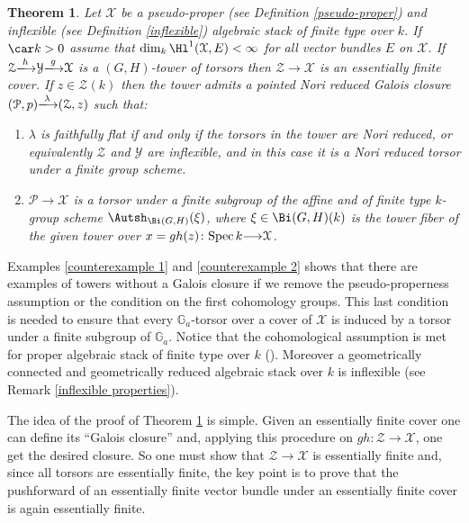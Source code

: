 \documentclass[12pt,reqno]{amsart}
\theoremstyle{plain}
\theoremstyle{definition}
\numberwithin{thm}{section}
\newcounter{x}\setcounter{x}{1}
\theoremstyle{plain}
\newtheorem{thmII}{Theorem}
\begin{document}
\begin{thmII}\label{main theorem for Galois closure}
 Let ${\mathcal{X}}$ be a pseudo-proper (see Definition \ref{pseudo-proper}) and inflexible
(see Definition \ref{inflexible}) algebraic stack of finite type over $k$. If $\car k > 0$ assume that $\dim_k \Hl^1({\mathcal{X}},E)<\infty$ for all vector bundles $E$ on ${\mathcal{X}}$. If ${\mathcal{Z}}{\xlongrightarrow{h}} {\mathcal{Y}}{\xlongrightarrow{g}} {\mathcal{X}}$ is a $(G,H)$-tower of torsors then ${\mathcal{Z}}{\longrightarrow} {\mathcal{X}}$ is an essentially finite cover. If $z\in {\mathcal{Z}}(k)$ then the tower admits a pointed Nori reduced Galois closure $({\mathcal{P}},p) {\xlongrightarrow{\lambda}} ({\mathcal{Z}},z)$ such that:
 \begin{enumerate}
 \item $\lambda$ is faithfully flat if and only if the torsors in the tower are Nori reduced, or equivalently ${\mathcal{Z}}$ and ${\mathcal{Y}}$ are inflexible, and in this case it is a Nori reduced torsor under a finite group scheme.
  \item ${\mathcal{P}}{\longrightarrow} {\mathcal{X}}$ is a torsor under a finite subgroup of the affine and of finite type $k$-group scheme $\Autsh_{\Bi(G,H)}(\xi)$, where $\xi\in \Bi(G,H)(k)$ is the tower fiber of the given tower over $x=gh(z)\colon {{\rm Spec \,}} k{\longrightarrow} {\mathcal{X}}$.
 \end{enumerate}
\end{thmII}
Examples \ref{counterexample 1} and \ref{counterexample 2} shows that there are examples of towers without a Galois closure if we remove the pseudo-properness assumption or the condition on the first cohomology groups. This last condition is needed to ensure that every $\mathbb G_a$-torsor over a cover of ${\mathcal{X}}$ is induced by a torsor under a finite subgroup of $\mathbb G_a$.
Notice that the cohomological assumption is met for proper algebraic stack of finite type over $k$ (\cite{Fal}). Moreover a geometrically connected and geometrically reduced algebraic stack over $k$ is inflexible (see Remark \ref{inflexible properties}).

The idea of the proof of Theorem \ref{main theorem for Galois closure} is simple. Given an essentially finite cover one can define its ``Galois closure'' and, applying this procedure on $gh\colon {\mathcal{Z}}{\longrightarrow} {\mathcal{X}}$, one get the desired closure. So one must show that ${\mathcal{Z}}{\longrightarrow} {\mathcal{X}}$ is essentially finite and, since all torsors are essentially finite,  the key point is to prove that the pushforward of an essentially finite vector bundle under an essentially finite cover is again essentially finite.
\end{document}
